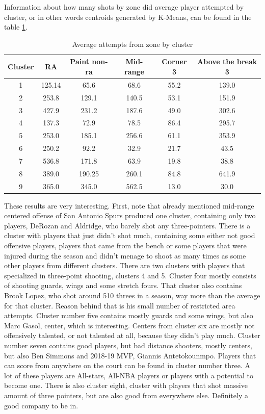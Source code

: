 \documentclass[a4paper]{article}
\begin{document}
Information about how many shots by zone did average player attempted by cluster, or in other words centroids generated by K-Means, can be found in the table \ref{tab:avg_by_clst}.

\begin{table}[!h]
\begin{center}
\begin{tabular}{|c|c|c|c|c|c|} \hline
Cluster & RA & Paint non-ra & Mid-range & Corner 3 & Above the break 3 \\ \hline
1 & 125.14 &  65.6 & 68.6 &  55.2 & 139.0 \\ \hline
2 & 253.8 & 129.1 & 140.5 & 53.1 & 151.9 \\ \hline
3 & 427.9 & 231.2 & 187.6 &  49.0 & 302.6 \\ \hline
4 & 137.3 & 72.9 & 78.5 & 86.4 & 295.7 \\ \hline
5 & 253.0 & 185.1 & 256.6 & 61.1 & 353.9 \\ \hline
6 & 250.2 & 92.2 & 32.9 & 21.7 & 43.5 \\ \hline
7 & 536.8 & 171.8 & 63.9 & 19.8 & 38.8 \\ \hline
8 & 389.0 & 190.25 & 260.1 & 84.8 & 641.9 \\ \hline
9 & 365.0 & 345.0 & 562.5 & 13.0 & 30.0 \\ \hline
\end{tabular}
\caption{Average attempts from zone by cluster}
\label{tab:avg_by_clst}
\end{center}
\end{table}

These results are very interesting. First, note that already mentioned mid-range centered offense of San Antonio Spurs produced one cluster, containing only two players, DeRozan and Aldridge, who barely shot any three-pointers. There is a cluster with players that just didn't shot much, containing some either not good offensive players, players that came from the bench or some players that were injured during the season and didn't menage to shoot as many times as some other players from different clusters. There are two clusters with players that specialized in three-point shooting, clusters 4 and 5. Cluster four mostly consists of shooting guards, wings and some stretch fours. That cluster also contains Brook Lopez, who shot around 510 threes in a season, way more than the average for that cluster. Reason behind that is his small number of restricted area attempts. Cluster number five contains mostly guards and some wings, but also Marc Gasol, center, which is interesting.  Centers from cluster six are mostly not offensively talented, or not talented at all, because they didn't play much. Cluster number seven contains good players, but bad distance shooters, mostly centers, but also Ben Simmons and 2018-19 MVP, Giannis Antetokounmpo. Players that can score from anywhere on the court can be found in cluster number three. A lot of these players are All-stars, All-NBA players or players with a potential to become one. There is  also cluster eight, cluster with players that shot massive amount of three pointers, but are also good from everywhere else. Definitely a good company to be in.
\end{document}
